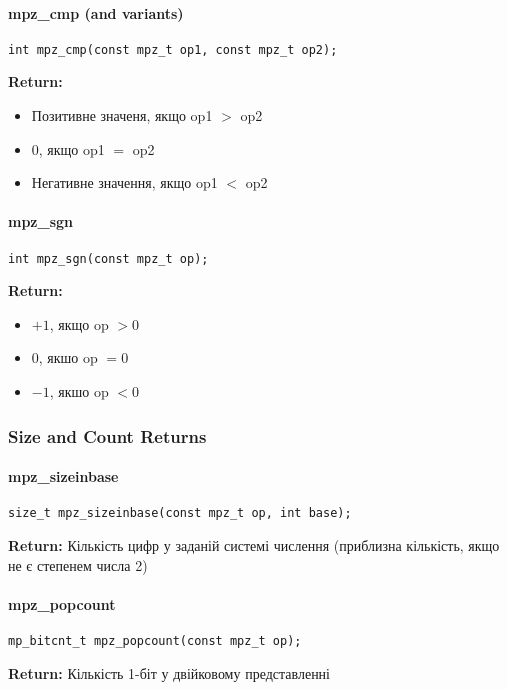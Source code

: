 \paragraph{mpz\_cmp (and variants)}
\begin{verbatim}
int mpz_cmp(const mpz_t op1, const mpz_t op2);
\end{verbatim}
\textbf{Return:}
\begin{itemize}
    \item Позитивне значеня, якщо op1 $>$ op2
    \item 0, якщо op1 $=$ op2
    \item Негативне значення, якщо op1 $<$ op2
\end{itemize}

\paragraph{mpz\_sgn}
\begin{verbatim}
int mpz_sgn(const mpz_t op);
\end{verbatim}
\textbf{Return:}
\begin{itemize}
    \item $+1$, якщо op $> 0$
    \item 0, якшо op $= 0$
    \item $-1$, якшо op $< 0$
\end{itemize}

\subsubsection{Size and Count Returns}

\paragraph{mpz\_sizeinbase}
\begin{verbatim}
size_t mpz_sizeinbase(const mpz_t op, int base);
\end{verbatim}
\textbf{Return:} Кількість цифр у заданій системі числення (приблизна кількість, якщо не є степенем числа 2)

\paragraph{mpz\_popcount}
\begin{verbatim}
mp_bitcnt_t mpz_popcount(const mpz_t op);
\end{verbatim}
\textbf{Return:} Кількість 1-біт у двійковому представленні

